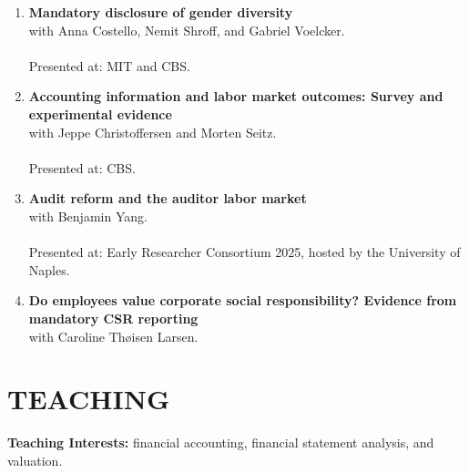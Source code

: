 \documentclass[letterpaper,9pt]{extarticle}
\begin{document}
\begin{enumerate}

\item \textbf{Mandatory disclosure of gender diversity} \\
with Anna Costello, Nemit Shroff, and Gabriel Voelcker. \\
\\
Presented at: MIT and CBS. \\

\item\textbf{Accounting information and labor market outcomes: Survey and experimental evidence} \\
with Jeppe Christoffersen and Morten Seitz. \\
\\
Presented at: CBS. \\

\item\textbf{Audit reform and the auditor labor market} \\
with Benjamin Yang. \\ 
\\
Presented at:  Early Researcher Consortium 2025, hosted by the University of Naples. \\


\item\textbf{Do employees value corporate social responsibility? Evidence from mandatory CSR reporting} \\
with Caroline Thøisen Larsen. \\ 

\end{enumerate}

\section*{TEACHING}
\textbf{Teaching Interests:} financial accounting, financial statement analysis, and valuation. 
\\
\end{document}
